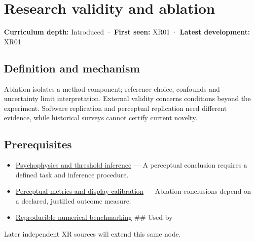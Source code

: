 \hypertarget{appendix-65788587ef78}{}\label{referencestart:appendix-65788587ef78}
\section{Research validity and ablation}\label{appendix-65788587ef78-research-validity-and-ablation}

\textbf{Curriculum depth:} Introduced · \textbf{First seen:} XR01 · \textbf{Latest development:} XR01

\subsection{Definition and mechanism}\label{appendix-65788587ef78-definition-and-mechanism}

Ablation isolates a method component; reference choice, confounds and uncertainty limit interpretation. External validity concerns conditions beyond the experiment. Software replication and perceptual replication need different evidence, while historical surveys cannot certify current novelty.

\subsection{Prerequisites}\label{appendix-65788587ef78-prerequisites}

\begin{itemize}
\item
  \hyperref[appendix-1759f03e8ce7]{Psychophysics and threshold inference} --- A perceptual conclusion requires a defined task and inference procedure.
\item
  \hyperref[appendix-b2c1846508bf]{Perceptual metrics and display calibration} --- Ablation conclusions depend on a declared, justified outcome measure.
\item
  \hyperref[appendix-b9db93e28371]{Reproducible numerical benchmarking} \#\# Used by
\end{itemize}

Later independent XR sources will extend this same node.

